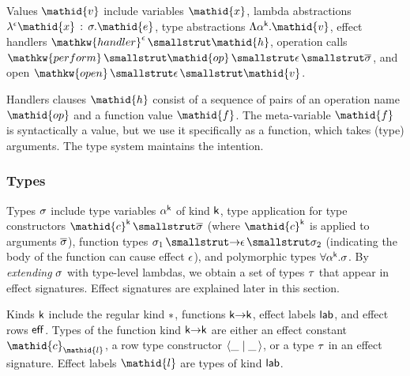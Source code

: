 \documentclass{llncs}
\newcommand{\midbar}{\mid}
\newcommand{\xcolon}{\,:\,}
\begin{document}
Values $\mathpre{\mathid{v}}$ include variables $\mathpre{\mathid{x}}$, lambda abstractions $\mathpre{\lambda^{{\epsilon}}\mathid{x}\xcolon{}{\sigma}.\mathid{e}}$,
type abstractions $\mathpre{\Lambda \alpha{}^\mathsf{k}.\mathid{v}}$, effect handlers $\mathpre{\mathkw{handler}^{\epsilon}~\mathid{h}}$, operation calls $\mathpre{\mathkw{perform}~\mathid{op}~{\epsilon}~{\overline\sigma}}$,
and open $\mathpre{\mathkw{open}~{\epsilon}~\mathid{v}}$.%

Handlers clauses $\mathpre{\mathid{h}}$ consist of a sequence of pairs of an operation name $\mathpre{\mathid{op}}$ and a function value $\mathpre{\mathid{f}}$.
The meta-variable $\mathpre{\mathid{f}}$ is syntactically a value, but we use it specifically as a function, which takes (type) arguments.
The type system maintains the intention.%

\subsubsection{Types}%

\noindent Types $\mathpre{{\sigma}}$ include type variables $\mathpre{\alpha{}^\mathsf{k}}$ of kind $\mathpre{\mathsf{k}}$,
type application for type constructors $\mathpre{\mathid{c}^\mathsf{k}~{\overline\sigma}}$ (where $\mathpre{\mathid{c}^\mathsf{k}}$ is applied to arguments $\mathpre{{\overline\sigma}}$),
function types $\mathpre{\sigma_{1}~{\rightarrow}{\epsilon}~\sigma_{2}}$ (indicating the body of the function can cause effect $\mathpre{{\epsilon}}$), and
polymorphic types $\mathpre{\forall \alpha{}^\mathsf{k}.{\sigma}}$.
By \emph{extending} $\mathpre{{\sigma}}$ with type-level lambdas, we obtain a set of types $\mathpre{{\tau}}$ that appear in effect signatures. Effect signatures are explained later in this section.%



Kinds $\mathpre{\mathsf{k}}$ include the regular kind $\mathpre{*}$, functions $\mathpre{\mathsf{k}{\rightarrow}\mathsf{k}}$,
effect labels $\mathpre{\mathsf{lab}}$, and effect rows $\mathpre{\mathsf{eff}}$.
Types of the function kind $\mathpre{\mathsf{k}{\rightarrow}\mathsf{k}}$ are either an effect constant $\mathpre{{\mathid{c}_\mathid{l}}}$, a row type constructor $\mathpre{\langle{}\_\midbar{}\_\,\rangle{}}$,
or a type $\mathpre{{\tau}}$ in an effect signature.
Effect labels $\mathpre{\mathid{l}}$ are types of kind $\mathpre{\mathsf{lab}}$.
\end{document}
